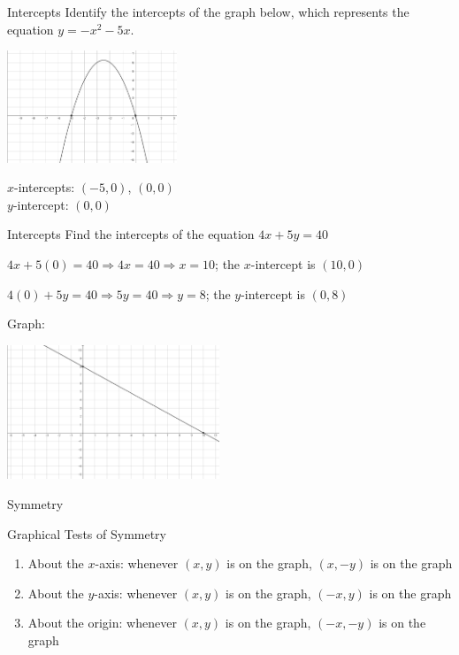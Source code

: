 \documentclass{beamer}
\begin{document}
\begin{frame}[t]{Intercepts}
Identify the intercepts of the graph below, which represents the equation $y = -x^2 - 5x$.

\includegraphics[width=2in]{GraphParabola1.png}

\pause

$x$-intercepts: $(-5,0)$, $(0,0)$ \\
$y$-intercept: $(0,0)$
\end{frame}

\begin{frame}[t]{Intercepts}
Find the intercepts of the equation $4x + 5y = 40$

\pause

$4x + 5(0) = 40 \Rightarrow 4x = 40 \Rightarrow x = 10$; the $x$-intercept is $(10,0)$

\pause

$4(0) + 5y = 40 \Rightarrow 5y = 40 \Rightarrow y = 8$; the $y$-intercept is $(0,8)$

\pause

Graph:

\includegraphics[width=2.5in]{GraphLine2.png}
\end{frame}

\begin{frame}[t]{Symmetry}
\begin{block}{Graphical Tests of Symmetry}
\begin{enumerate}[1)]
\item About the $x$-axis: whenever $(x,y)$ is on the graph, $(x,-y)$ is on the graph
\item About the $y$-axis: whenever $(x,y)$ is on the graph, $(-x,y)$ is on the graph
\item About the origin: whenever $(x,y)$ is on the graph, $(-x,-y)$ is on the graph
\end{enumerate}
\end{block}
\end{frame}
\end{document}
